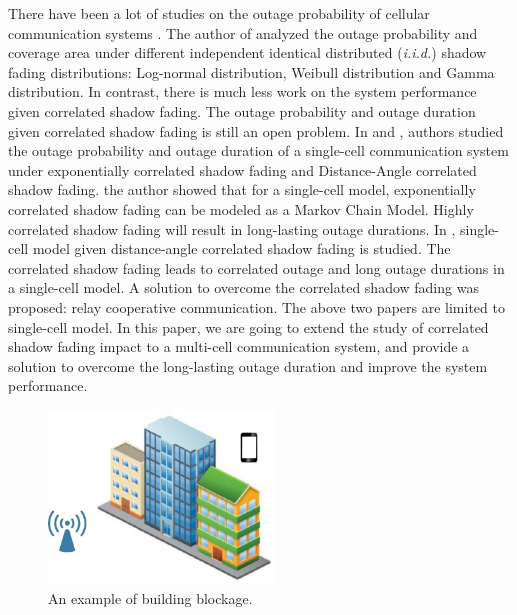 \documentclass[journal,comsoc]{IEEEtran}
\begin{document}
\par There have been a lot of studies on the outage probability of cellular communication systems \cite{abu1991outage, petrovic2013outage, emamian2014outage}. The author of \cite{vural2015effect} analyzed the outage probability and coverage area under different independent identical distributed (\emph{i.i.d.}) shadow fading distributions: Log-normal distribution, Weibull distribution and Gamma distribution. In contrast, there is much less work on the system performance given correlated shadow fading. The outage probability and outage duration given correlated shadow fading is still an open problem. In \cite{lu2015long} and \cite{lu2015shining}, authors studied the outage probability and outage duration of a single-cell communication system under exponentially correlated shadow fading and Distance-Angle correlated shadow fading. \cite{lu2015long} the author showed that for a single-cell model, exponentially correlated shadow fading can be modeled as a Markov Chain Model. Highly correlated shadow fading will result in long-lasting outage durations. In \cite{lu2015shining}, single-cell model given distance-angle correlated shadow fading is studied. The correlated shadow fading leads to correlated outage and long outage durations in a single-cell model. A solution to overcome the correlated shadow fading was proposed: relay cooperative communication. The above two papers are limited to single-cell model. In this paper, we are going to extend the study of correlated shadow fading impact to a multi-cell communication system, and provide a solution to overcome the long-lasting outage duration and improve the system performance.
\begin{figure}
\centering
\includegraphics[width=6cm]{building.eps}
\caption{An example of building blockage.}
\label{building}
\end{figure}
\end{document}
